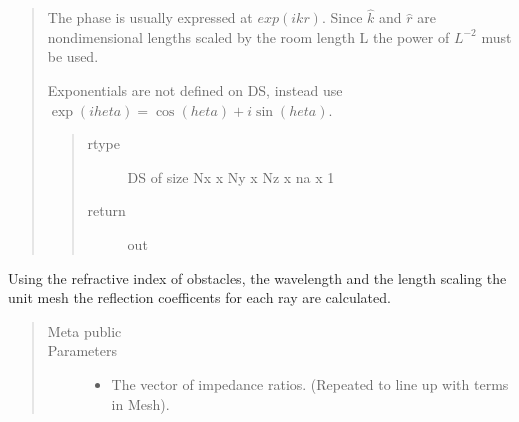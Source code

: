 \documentclass[letterpaper,10pt,english]{sphinxmanual}
\begin{document}
\begin{fulllineitems}
\begin{fulllineitems}
\begin{quote}
The phase is usually expressed at \(exp(ikr)\).
Since \(\hat{k}\) and \(\hat{r}\) are nondimensional lengths     scaled by the room length L the power of \(L^{-2}\) must be used.

Exponentials are not defined on DS, instead use     \(\exp(i   heta)=\cos(     heta)+i\sin(    heta)\).

\begin{sphinxVerbatim}[commandchars=\\\{\}]
\end{sphinxVerbatim}
\begin{quote}\begin{description}
\item[{rtype}] \leavevmode
DS of size Nx x Ny x Nz x na x 1

\item[{return}] \leavevmode
out

\end{description}\end{quote}
\end{quote}

\end{fulllineitems}


\begin{fulllineitems}
\label{\detokenize{index:DictionarySparseMatrix.DS.refcoefbyterm_withmul}}
Using the refractive index of obstacles, the wavelength and the
length scaling the unit mesh the reflection coefficents for each ray
are calculated.
\begin{quote}\begin{description}
\item[{Meta public}] \leavevmode
\item[{Parameters}] \leavevmode\begin{itemize}
\item {} 
 \textendash{} The vector of impedance ratios. (Repeated to line up with terms in Mesh).


\end{itemize}
\end{description}
\end{quote}
\end{fulllineitems}
\end{fulllineitems}
\end{document}
